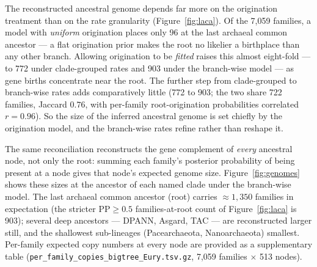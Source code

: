 \documentclass[11pt]{article}
\begin{document}
The reconstructed ancestral genome depends far more on the origination treatment than on the
rate granularity (Figure~\ref{fig:laca}). Of the 7{,}059 families, a model with \emph{uniform}
origination places only 96 at the last archaeal common ancestor --- a flat origination prior
makes the root no likelier a birthplace than any other branch. Allowing origination to be
\emph{fitted} raises this almost eight-fold --- to 772 under clade-grouped rates and 903 under
the branch-wise model --- as gene births concentrate near the root. The further step from
clade-grouped to branch-wise rates adds comparatively little (772 to 903; the two share 722
families, Jaccard $0.76$, with per-family root-origination probabilities correlated $r=0.96$).
So the size of the inferred ancestral genome is set chiefly by the origination model, and the
branch-wise rates refine rather than reshape it.

The same reconciliation reconstructs the gene complement of \emph{every} ancestral node, not
only the root: summing each family's posterior probability of being present at a node gives that
node's expected genome size. Figure~\ref{fig:genomes} shows these sizes at the ancestor of each
named clade under the branch-wise model. The last archaeal common ancestor (root) carries
$\approx$$1{,}350$ families in expectation (the stricter $\mathrm{PP}\!\ge\!0.5$ families-at-root
count of Figure~\ref{fig:laca} is 903); several deep ancestors --- DPANN, Asgard, TAC --- are
reconstructed larger still, and the shallowest sub-lineages (Pacearchaeota, Nanoarchaeota)
smallest. Per-family expected copy numbers at every node are provided as a supplementary table
(\texttt{per\_family\_copies\_bigtree\_Eury.tsv.gz}, 7{,}059 families $\times$ 513 nodes).
\end{document}
